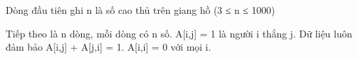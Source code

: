 Dòng đầu tiên ghi n là số cao thủ trên giang hồ (3 ≤ n ≤ 1000)  

   Tiếp theo là n dòng, mỗi dòng có n số. A[i,j] = 1 là người i thắng j. Dữ liệu luôn đảm bảo A[i,j] + A[j,i] = 1. A[i,i] = 0 với mọi i.